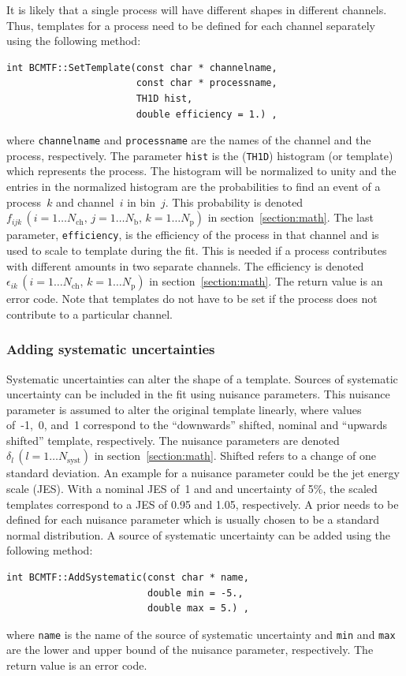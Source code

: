 \documentclass[11pt, a4paper]{article}
\begin{document}
It is likely that a single process will have different shapes in
different channels. Thus, templates for a process need to be defined
for each channel separately using the following method:
%
\begin{verbatim}
int BCMTF::SetTemplate(const char * channelname,
                       const char * processname,
                       TH1D hist,
                       double efficiency = 1.) ,
\end{verbatim}
%
where \verb|channelname| and \verb|processname| are the names of the
channel and the process, respectively. The parameter \verb|hist| is
the (\verb|TH1D|) histogram (or template) which represents the
process. The histogram will be normalized to unity and the entries in
the normalized histogram are the probabilities to find an event of a
process~$k$ and channel~$i$ in bin~$j$. This probability is denoted
$f_{ijk}\,(i=1\dots N_{\mathrm{ch}}, \, j=1\dots N_{\mathrm{b}}, \,
k=1\dots N_{\mathrm{p}})$ in section~\ref{section:math}. The last
parameter, \verb|efficiency|, is the efficiency of the process in that
channel and is used to scale to template during the fit. This is
needed if a process contributes with different amounts in two separate
channels. The efficiency is denoted $\epsilon_{ik} \, (i=1\dots
N_{\mathrm{ch}}, \, k=1\dots N_{\mathrm{p}})$ in
section~\ref{section:math}. The return value is an error code. Note
that templates do not have to be set if the process does not
contribute to a particular channel.

\subsubsection{Adding systematic uncertainties}

Systematic uncertainties can alter the shape of a template. Sources of
systematic uncertainty can be included in the fit using nuisance
parameters. This nuisance parameter is assumed to alter the original
template linearly, where values of~-1,~0, and~1 correspond to the
``downwards'' shifted, nominal and ``upwards shifted'' template,
respectively. The nuisance parameters are denoted $\delta_{l} \,
(l=1\dots N_{\mathrm{syst}})$ in section~\ref{section:math}. Shifted
refers to a change of one standard deviation. An example for a
nuisance parameter could be the jet energy scale (JES). With a nominal
JES of~1 and and uncertainty of 5\%, the scaled templates correspond
to a JES of 0.95 and 1.05, respectively. A prior needs to be defined
for each nuisance parameter which is usually chosen to be a standard
normal distribution. A source of systematic uncertainty can be added
using the following method:
%
\begin{verbatim}
int BCMTF::AddSystematic(const char * name,
                         double min = -5.,
                         double max = 5.) ,
\end{verbatim}
%
where \verb|name| is the name of the source of systematic uncertainty
and \verb|min| and \verb|max| are the lower and upper bound of the
nuisance parameter, respectively. The return value is an error code.
\end{document}
